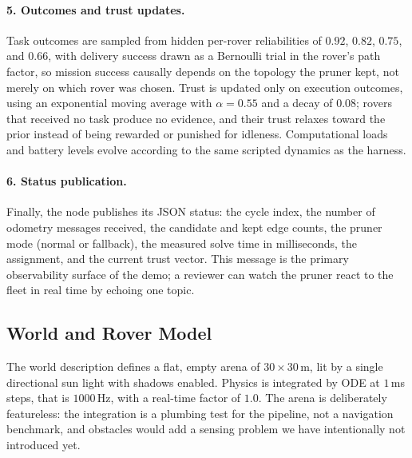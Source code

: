 \paragraph{5. Outcomes and trust updates.}
Task outcomes are sampled from hidden per-rover reliabilities of $0.92$,
$0.82$, $0.75$, and $0.66$, with delivery success drawn as a Bernoulli
trial in the rover's path factor, so mission success causally depends on
the topology the pruner kept, not merely on which rover was chosen.
Trust is updated only on execution outcomes, using an exponential moving
average with $\alpha = 0.55$ and a decay of $0.08$; rovers that received
no task produce no evidence, and their trust relaxes toward the prior
instead of being rewarded or punished for idleness. Computational loads
and battery levels evolve according to the same scripted dynamics as the
harness.

\paragraph{6. Status publication.}
Finally, the node publishes its JSON status: the cycle index, the number
of odometry messages received, the candidate and kept edge counts, the
pruner mode (normal or fallback), the measured solve time in
milliseconds, the assignment, and the current trust vector. This message
is the primary observability surface of the demo; a reviewer can watch
the pruner react to the fleet in real time by echoing one topic.


\subsection{World and Rover Model}
\label{sec:gazebo:world}

The world description defines a flat, empty arena of $30 \times 30$\,m,
lit by a single directional sun light with shadows enabled. Physics is
integrated by ODE at $1$\,ms steps, that is $1000$\,Hz, with a real-time
factor of $1.0$. The arena is deliberately featureless: the integration
is a plumbing test for the pipeline, not a navigation benchmark, and
obstacles would add a sensing problem we have intentionally not
introduced yet.

